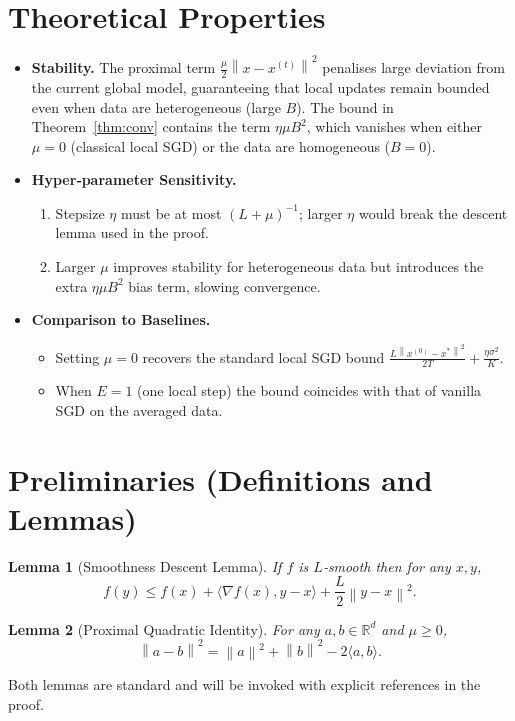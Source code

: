 \documentclass{article}
\newtheorem{lemma}{Lemma}
\newcommand{\norm}[1]{\left\lVert#1\right\rVert}
\begin{document}
\section*{Theoretical Properties}
\begin{itemize}
    \item \textbf{Stability.} The proximal term $\frac{\mu}{2}\norm{x-x^{(t)}}^{2}$ penalises large deviation from the current global model, guaranteeing that local updates remain bounded even when data are heterogeneous (large $B$). The bound in Theorem~\ref{thm:conv} contains the term $\eta\mu B^{2}$, which vanishes when either $\mu=0$ (classical local SGD) or the data are homogeneous ($B=0$).
    \item \textbf{Hyper‑parameter Sensitivity.}
          \begin{enumerate}
              \item Stepsize $\eta$ must be at most $(L+\mu)^{-1}$; larger $\eta$ would break the descent lemma used in the proof.
              \item Larger $\mu$ improves stability for heterogeneous data but introduces the extra $\eta\mu B^{2}$ bias term, slowing convergence.
          \end{enumerate}
    \item \textbf{Comparison to Baselines.}
          \begin{itemize}
              \item Setting $\mu=0$ recovers the standard local SGD bound
                $\frac{L\norm{x^{(0)}-x^{*}}^{2}}{2T}+\frac{\eta\sigma^{2}}{K}$.
              \item When $E=1$ (one local step) the bound coincides with that of vanilla SGD on the averaged data.
          \end{itemize}
\end{itemize}

\vspace{0.3cm}
\section*{Preliminaries (Definitions and Lemmas)}
\begin{lemma}[Smoothness Descent Lemma]\label{lem:descent}
If $f$ is $L$‑smooth then for any $x,y$,
\[
f(y)\le f(x)+\langle\nabla f(x),y-x\rangle+\frac{L}{2}\norm{y-x}^{2}.
\]
\end{lemma}
\begin{lemma}[Proximal Quadratic Identity]\label{lem:prox-quad}
For any $a,b\in\mathbb{R}^{d}$ and $\mu\ge0$,
\[
\norm{a-b}^{2}= \norm{a}^{2}+\norm{b}^{2}-2\langle a,b\rangle .
\]
\end{lemma}
Both lemmas are standard and will be invoked with explicit references in the proof.
\end{document}
